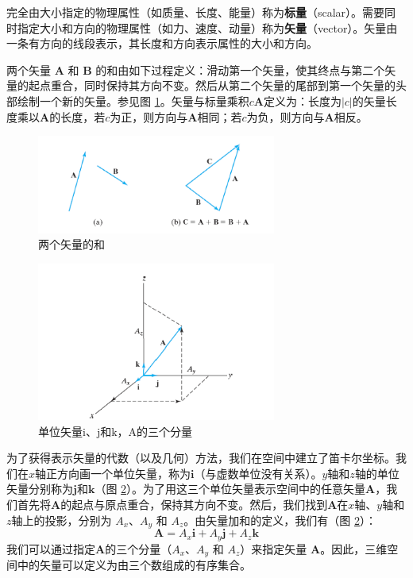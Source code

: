     完全由大小指定的物理属性（如质量、长度、能量）称为\textbf{标量}（scalar）。需要同时指定大小和方向的物理属性（如力、速度、动量）称为\textbf{矢量}（vector）。矢量由一条有方向的线段表示，其长度和方向表示属性的大小和方向。

    两个矢量 $\mathbf{A}$ 和 $\mathbf{B}$ 的和由如下过程定义：滑动第一个矢量，使其终点与第二个矢量的起点重合，同时保持其方向不变。然后从第二个矢量的尾部到第一个矢量的头部绘制一个新的矢量。参见图 \ref{fig:5.1}。矢量与标量乘积$c\mathbf{A}$定义为：长度为$\left|c\right|$的矢量长度乘以$\mathbf{A}$的长度，若$c$为正，则方向与$\mathbf{A}$相同；若$c$为负，则方向与$\mathbf{A}$相反。
    \begin{figure}[h!]
        \centering
        \includegraphics[width=0.7\textwidth]{Figures/5.1.png}
        \caption{两个矢量的和}
        \label{fig:5.1}
    \end{figure}
    \begin{figure}[h!]
        \centering
        \includegraphics[width=0.7\textwidth]{Figures/5.2.png}
        \caption{单位矢量$\mathrm{i}$、$\mathrm{j}$和$\mathrm{k}$，$\mathrm{A}$的三个分量}
        \label{fig:5.2}
    \end{figure}

    为了获得表示矢量的代数（以及几何）方法，我们在空间中建立了笛卡尔坐标。我们在$x$轴正方向画一个单位矢量，称为$\mathbf{i}$（与虚数单位没有关系）。$y$轴和$z$轴的单位矢量分别称为$\mathbf{j}$和$\mathbf{k}$（图 \ref{fig:5.2}）。为了用这三个单位矢量表示空间中的任意矢量$\mathbf{A}$，我们首先将$\mathbf{A}$的起点与原点重合，保持其方向不变。然后，我们找到$\mathbf{A}$在$x$轴、$y$轴和$z$轴上的投影，分别为 $A_x$、$A_y$ 和 $A_z$。由矢量加和的定义，我们有（图 \ref{fig:5.2}）：
    \begin{equation}
        \boxed{
            \mathbf{A} = A_x\mathbf{i} + A_y\mathbf{j} + A_z\mathbf{k}
        }
        \label{eq:5.17}
    \end{equation}
    我们可以通过指定$\mathbf{A}$的三个分量（$A_x$、$A_y$ 和 $A_z$）来指定矢量 $\mathbf{A}$。因此，三维空间中的矢量可以定义为由三个数组成的有序集合。

